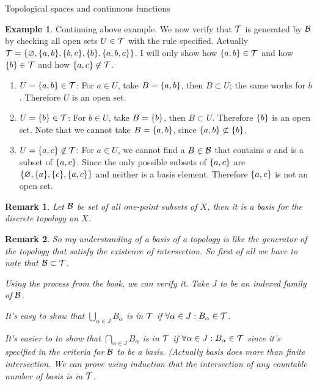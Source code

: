 \documentclass{report}
\let\emptyset\varnothing
\newtheorem*{remark}{Remark}
\theoremstyle{definition}
\newtheorem{example}{Example}[theorem]
\newcommand{\set}[1]{\ensuremath\{#1\}}
\begin{document}
\begin{chapter}{Topological spaces and continuous functions}
  \begin{example}
    Continuing above example. We now verify that $\mathcal{T}$ is generated by
    $\mathcal{B}$ by checking all open sets $U\in\mathcal{T}$ with the rule specified.
    Actually \\
    ${\T=\set{\emptyset, \set{a,b}, \set{b,c}, \set{b},
        \set{a,b,c}}}$. I will only show how $\set{a,b}\in\T$ and how
    $\set{b}\in\T$ and how $\set{a,c}\not\in\T$.

    \begin{enumerate}
    \item $U=\set{a,b}\in\T$: For $a\in U$, take $B=\set{a,b}$, then
      $B\subset U$; the same works for $b$. Therefore $U$ is an open
      set.
    \item $U=\set{b}\in\T$: For $b\in U$, take $B=\set{b}$, then
      $B\subset U$. Therefore $\set{b}$ is an open set. Note that we
      cannot take $B=\set{a,b}$, since $\set{a,b}\not\subset \set{b}$.
    \item $U=\set{a,c}\not\in\T$: For $a\in U$, we cannot find a
      $B\in\mathcal{B}$ that contains $a$ and is a subset of $\set{a,c}$. Since
      the only possible subsets of $\set{a,c}$ are $\set{\emptyset,
        \set{a}, \set{c}, \set{a,c}}$ and neither is a basis
      element. Therefore $\set{a,c}$ is not an open set.
    \end{enumerate}
  \end{example}
  \begin{remark}
    Let $\mathcal{B}$ be set of all one-point subsets of $X$, then it is a
    basis for the discrete topology on $X$.
  \end{remark}
  \begin{remark}
    So my understanding of a basis of a topology is like the generator
    of the topology that satisfy the existence of intersection. So
    first of all we have to note that $\mathcal{B}\subset\mathcal{T}$.

    Using the process from the book, we can verify it. Take $J$ to be
    an indexed family of $\mathcal{B}$.

    It's easy to show that $\bigcup_{\alpha\in J} B_\alpha$ is in $\mathcal{T}$
    if $\forall \alpha\in J : B_\alpha\in\mathcal{T}$.

    It's easier to to show that $\bigcap_{\alpha\in J} B_\alpha$ is in
    $\mathcal{T}$ if $\forall \alpha\in J: B_\alpha\in\mathcal{T}$ since it's specified
    in the criteria for $\mathcal{B}$ to be a basis. (Actually basis does more
    than finite intersection. We can prove using induction that the
    intersection of any countable number of basis is in $\mathcal{T}$.


\end{remark}
\end{chapter}
\end{document}
